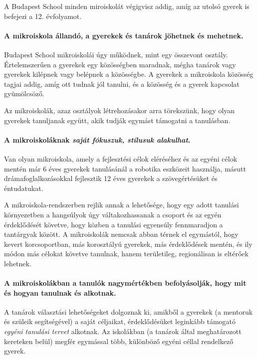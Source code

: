 A Budapest School minden miroiskolát végigvisz
addig, amíg az utolsó gyerek is befejezi a 12. évfolyamot.

\paragraph{A mikroiskola állandó, a gyerekek és tanárok jöhetnek és mehetnek.}
Budapest School mikroiskolái úgy működnek, mint egy összevont osztály.
Értelemszerűen a gyerekek egy közösségben maradnak, mégha
tanárok vagy gyerekek kilépnek vagy belépnek a közösségbe. A gyerekek a
mikroiskola közösség tagjai addig, amíg ott
tudnak jól tanulni, és a közösség és a gyerek kapcsolat gyümölcsöző.

Az mikroiskolák, azaz osztályok létrehozásakor arra törekszünk, hogy
olyan gyerekek tanuljanak együtt, akik tudják egymást támogatni a tanulásban.

\paragraph{A mikroiskoláknak \emph{saját fókuszuk, stílusuk alakulhat}.}

Van olyan mikroiskola, amely a fejlesztési célok eléréséhez és az egyéni
célok
mentén már 6 éves gyerekek tanulásánál a robotika eszközeit használja,
másutt drámafoglalkozásokkal fejlesztik 12 éves gyerekek a szövegértésüket
és
éntudatukat.

A mikroiskola-rendszerben rejlik annak a lehetősége, hogy egy adott tanulási
környezetben a hangsúlyok úgy váltakozhassanak a csoport és az egyén
érdeklődését követve, hogy közben a tanulási egyensúly fennmaradjon a
tantárgyak között. A mikroiskolák nemcsak abban térnek el
egymástól, hogy kevert korcsoportban, más korosztályú gyerekek, más
érdeklődések mentén, és ily módon más célokat követve tanulnak, hanem
területileg, regionálisan is eltérőek lehetnek.

\paragraph{A mikroiskolákban a tanulók nagymértékben befolyásolják, hogy mit és
    hogyan tanulnak és alkotnak.}

A tanárok választási lehetőségeket dolgoznak ki, amikből a gyerekek (a
mentoruk és szüleik segítségével) a saját céljaikat, érdeklődésüket
leginkább
támogató \emph{egyéni tanulási tervet} alkotnak. Az iskolákban (a tanárok
által
meghatározott kereteken belül) megfér egymással több, különböző egyéni
céllal
rendelkező gyerek.

